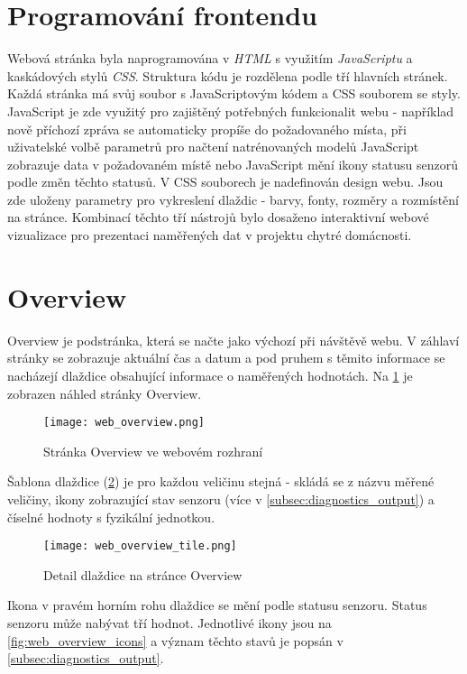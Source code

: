 \section{Programování frontendu} \label{sec:frontend}
Webová stránka byla naprogramována v \textit{HTML} s využitím \textit{JavaScriptu} a kaskádových stylů \textit{CSS}. Struktura kódu je rozdělena podle tří hlavních stránek. Každá stránka má svůj soubor s JavaScriptovým kódem a CSS souborem se styly. JavaScript je zde využitý pro zajištěný potřebných funkcionalit webu - například nově příchozí zpráva se automaticky propíše do požadovaného místa, při uživatelské volbě parametrů pro načtení natrénovaných modelů JavaScript zobrazuje data v požadovaném místě nebo JavaScript mění ikony statusu senzorů podle změn těchto statusů. V CSS souborech je nadefinován design webu. Jsou zde uloženy parametry pro vykreslení dlaždic - barvy, fonty, rozměry a rozmístění na stránce. Kombinací těchto tří nástrojů bylo dosaženo interaktivní webové vizualizace pro prezentaci naměřených dat v projektu chytré domácnosti.

\section{Overview} \label{sec:overview}

Overview je podstránka, která se načte jako výchozí při návštěvě webu. V záhlaví stránky se zobrazuje aktuální čas a datum a pod pruhem s těmito informace se nacházejí dlaždice obsahující informace o naměřených hodnotách. Na \cref{fig:web_overview} je zobrazen náhled stránky Overview. 

\begin{figure}[H]
  \centering
  \texttt{[image: web\_overview.png]}
  \caption{Stránka Overview ve webovém rozhraní}
  \label{fig:web_overview}
\end{figure}  

Šablona dlaždice (\cref{fig:web_overview_tile}) je pro každou veličinu stejná - skládá se z názvu měřené veličiny, ikony zobrazující stav senzoru (více v \cref{subsec:diagnostics_output}) a číselné hodnoty s fyzikální jednotkou.

\begin{figure}[H]
  \centering
  \texttt{[image: web\_overview\_tile.png]}
  \caption{Detail dlaždice na stránce Overview}
  \label{fig:web_overview_tile}
\end{figure}

Ikona v pravém horním rohu dlaždice se mění podle statusu senzoru. Status senzoru může nabývat tří hodnot. Jednotlivé ikony jsou na \cref{fig:web_overview_icons} a význam těchto stavů je popsán v \cref{subsec:diagnostics_output}. 

